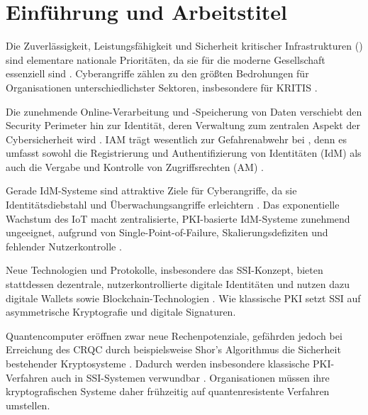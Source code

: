 \newpage
\section{Einführung und Arbeitstitel} \label{sec:Einführung und Arbeitstitel}

Die Zuverlässigkeit, Leistungsfähigkeit und Sicherheit kritischer Infrastrukturen () sind elementare nationale Prioritäten, da sie für die moderne Gesellschaft essenziell sind \parencite[S. 1]{alcaraz_CriticalInfrastructureProtectionRequirementschallenges21stcentury_2015}. Cyberangriffe zählen zu den größten Bedrohungen für Organisationen unterschiedlichster Sektoren, insbesondere für \ac{KRITIS} \parencite[S. 1]{osliak_CyberThreatIntelligencecriticalinfrastructuresecurity_2023}.

Die zunehmende Online-Verarbeitung und -Speicherung von Daten verschiebt den Security Perimeter hin zur Identität, deren Verwaltung zum zentralen Aspekt der Cybersicherheit wird \parencite[S. 191]{josang_CybersecurityTechnologyGovernance_2025}. \ac{IAM} trägt wesentlich zur Gefahrenabwehr bei \parencite[S. 4]{nosouhi_ValueStrongIdentityAccessManagementICSOTSecurity_2024}, denn es umfasst sowohl die Registrierung und Authentifizierung von Identitäten (\ac{IdM}) als auch die Vergabe und Kontrolle von Zugriffsrechten (\ac{AM}) \parencite[S. 191]{josang_CybersecurityTechnologyGovernance_2025}.

Gerade \ac{IdM}-Systeme sind attraktive Ziele für Cyberangriffe, da sie Identitätsdiebstahl und Überwachungsangriffe erleichtern \parencite[S. 68]{fritsch_IdentityManagementTargetcyberwar_2020}. Das exponentielle Wachstum des \ac{IoT} macht zentralisierte, \ac{PKI}-basierte \ac{IdM}-Systeme zunehmend ungeeignet, aufgrund von Single-Point-of-Failure, Skalierungsdefiziten und fehlender Nutzerkontrolle \parencite[S. 1]{ramirez-gordillo_DecentralizedIdentityManagementInternetThingsIoTDevicesUsingIOTABlockchainTechnology_2025}.

Neue Technologien und Protokolle, insbesondere das \ac{SSI}-Konzept, bieten stattdessen dezentrale, nutzerkontrollierte digitale Identitäten und nutzen dazu digitale Wallets sowie Blockchain-Technologien \parencite[S. 6]{allendelopez_SelfSovereignIdentityFutureIdentitySelfSovereignityDigitalWalletsBlockchain_2020}. Wie klassische \ac{PKI} setzt \ac{SSI} auf asymmetrische Kryptografie und digitale Signaturen.

Quantencomputer eröffnen zwar neue Rechenpotenziale, gefährden jedoch bei Erreichung des \gls{CRQC} durch beispielsweise Shor's Algorithmus die Sicherheit bestehender Kryptosysteme \parencite[S. 338, 341]{geremew_PreparingCriticalInfrastructurePostQuantumCryptographyStrategiesTransitioningAheadCryptanalyticallyRelevantQuantumComputing_2024}. Dadurch werden insbesondere klassische \ac{PKI}-Verfahren auch in \ac{SSI}-Systemen verwundbar \parencite[S. 2-3]{solavagione_TransitionSelfSovereignIdentityPostQuantumCryptography_2025}. Organisationen müssen ihre kryptografischen Systeme daher frühzeitig auf quantenresistente Verfahren umstellen.

